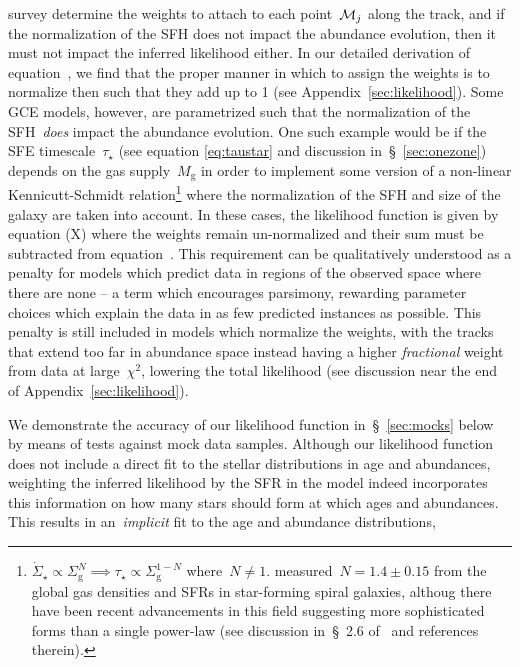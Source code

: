 \documentclass[ms.tex]{subfiles}
\begin{document}
survey determine the weights to attach to each point~$\mathcal{M}_j$ along the
track, and if the normalization of the SFH does not impact the abundance
evolution, then it must not impact the inferred likelihood either.
In our detailed derivation of equation~, we find that the
proper manner in which to assign the weights is to normalize then such that
they add up to 1 (see Appendix~\ref{sec:likelihood}).
Some GCE models, however, are parametrized such that the normalization of the
SFH~\textit{does} impact the abundance evolution.
One such example would be if the SFE timescale~$\tau_\star$ (see equation
\ref{eq:taustar} and discussion in~\S~\ref{sec:onezone}) depends on the gas
supply~$M_\text{g}$ in order to implement some version of a non-linear
Kennicutt-Schmidt relation\footnote{
	$\dot{\Sigma}_\star \propto \Sigma_\text{g}^N \implies \tau_\star \propto
	\Sigma_\text{g}^{1 - N}$ where~$N \neq 1$.
	\citet{Kennicutt1998} measured~$N = 1.4 \pm 0.15$ from the global gas
	densities and SFRs in star-forming spiral galaxies, althoug there have
	been recent advancements in this field suggesting more sophisticated forms
	than a single power-law (see discussion in~\S~2.6 of~\citealt{Johnson2021}
	and references therein).
} where the normalization of the SFH and size of the galaxy are taken into
account.
In these cases, the likelihood function is given by equation (X) where the
weights remain un-normalized and their sum must be subtracted from
equation~.
This requirement can be qualitatively understood as a penalty for models which
predict data in regions of the observed space where there are none -- a term
which encourages parsimony, rewarding parameter choices which explain the data
in as few predicted instances as possible.
This penalty is still included in models which normalize the weights, with the
tracks that extend too far in abundance space instead having a higher
\textit{fractional} weight from data at large~$\chi^2$, lowering the total
likelihood (see discussion near the end of Appendix~\ref{sec:likelihood}).
\par
We demonstrate the accuracy of our likelihood function in~\S~\ref{sec:mocks}
below by means of tests against mock data samples.
Although our likelihood function does not include a direct fit to the
stellar distributions in age and abundances, weighting the inferred likelihood
by the SFR in the model indeed incorporates this information on how many stars
should form at which ages and abundances.
This results in an~\textit{implicit} fit to the age and abundance distributions,
\end{document}

